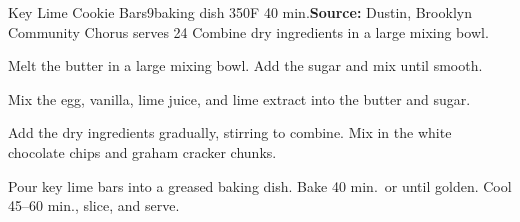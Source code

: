 \begin{recipe}{Key Lime Cookie Bars}{9\inch{}\inch baking dish \hfill 350\0F \hfill 40 min.}{\textbf{Source:} Dustin, Brooklyn Community Chorus \hfill serves 24}
 Combine dry ingredients in a large mixing bowl.

 Melt the butter in a large mixing bowl. Add the sugar and mix until smooth.

 Mix the egg, vanilla, lime juice, and lime extract into the butter and sugar.

 Add the dry ingredients gradually, stirring to combine. Mix in the white chocolate chips and graham cracker chunks.

 \newstep Pour key lime bars into a greased baking dish. Bake 40 min.\ or until golden. Cool 45--60 min., slice, and serve.

\end{recipe}
